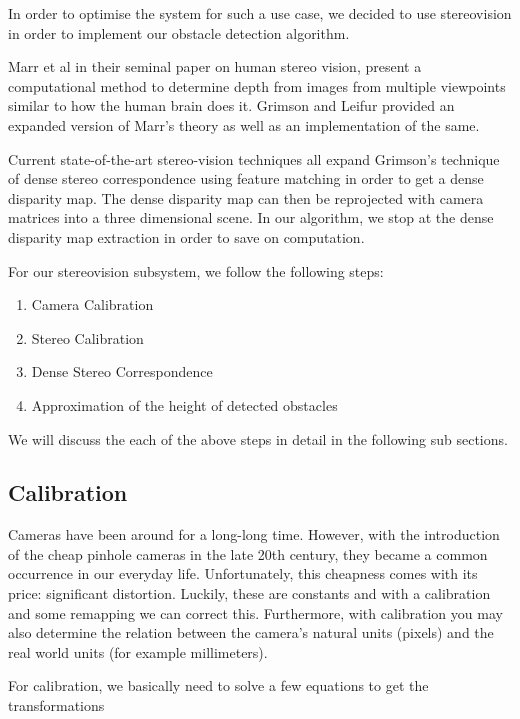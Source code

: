 \documentclass[11pt]{report}
\begin{document}
{{In order to optimise the system for such a use case, we decided to use stereovision\cite{gonzalez,hartley2000multiple} in order to implement our obstacle detection algorithm. 

Marr et al\cite{marr1991computational} in their seminal paper on human stereo vision, present a computational method to determine depth from images from multiple viewpoints similar to how the human brain does it. Grimson and Leifur \cite{grimson1981computer} provided an expanded version of Marr's theory as well as an implementation of the same.

Current state-of-the-art stereo-vision techniques\cite{taxonomy} all expand Grimson's technique of dense stereo correspondence using feature matching in order to get a dense disparity map. The dense disparity map can then be reprojected with camera matrices into a three dimensional scene. In our algorithm, we stop at the dense disparity map extraction in order to save on computation.

For our stereovision subsystem, we follow the following steps:

\begin{enumerate}
\item Camera Calibration
\item Stereo Calibration
\item Dense Stereo Correspondence
\item Approximation of the height of detected obstacles
\end{enumerate} 

We will discuss the each of the above steps in detail in the following sub sections.
\label{calib}
\subsection{Calibration}

Cameras have been around for a long-long time. However, with the introduction of the cheap pinhole cameras in the late 20th century, they became a common occurrence in our everyday life. Unfortunately, this cheapness comes with its price: significant distortion. Luckily, these are constants and with a calibration and some remapping we can correct this. Furthermore, with calibration you may also determine the relation between the camera’s natural units (pixels) and the real world units (for example millimeters). 

For calibration, we basically need to solve a few equations to get the transformations

}}
\end{document}
